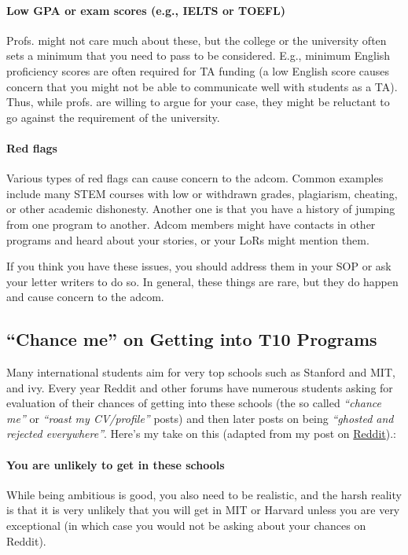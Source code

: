 \documentclass[oneside,11pt]{book}
\begin{document}
\paragraph{Low GPA or exam scores (e.g., IELTS or TOEFL)}  Profs. might not care much about these, but the college or the university often sets a minimum that you need to pass to be considered.  E.g., minimum English proficiency scores are often required for TA funding (a low English score causes concern that you might not be able to communicate well with students as a TA).  Thus, while profs. are willing to argue for your case, they might be reluctant to go against the requirement of the university.


\paragraph{Red flags} Various types of red flags can cause concern to the adcom. Common examples include many STEM courses with low or withdrawn grades, plagiarism, cheating, or other academic dishonesty. Another one is that you have a history of jumping from one program to another. Adcom members might have contacts in other programs and heard about your stories, or your LoRs might mention them.

If you think you have these issues, you should address them in your SOP or ask your letter writers to do so.
In general, these things are rare, but they do happen and cause concern to the adcom.


\subsection{``Chance me'' on Getting into T10 Programs}\label{sec:chance-me}

Many international students aim for very top schools such as Stanford and MIT, and \Gls{ivy}. Every year Reddit and other forums have numerous students asking for evaluation of their chances of getting into these schools (the so called \emph{``chance me''} or \emph{``roast my CV/profile''} posts) and then later posts on being \emph{``ghosted and rejected everywhere''}. Here's my take on this (adapted from my post on \href{https://www.reddit.com/r/gradadmissions/comments/1fogyg5/reality_check_for_aspiring_phd_applicants_youre/}{Reddit}).:

\paragraph{You are unlikely to get in these schools}  While being ambitious is good, you also need to be realistic, and the harsh reality is that it is very unlikely that you will get in MIT or Harvard unless you are very exceptional (in which case you would not be asking about your chances on Reddit). 
\end{document}
